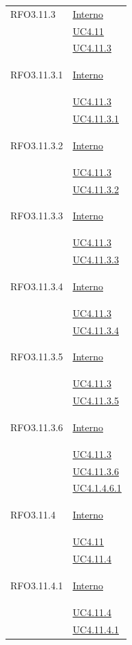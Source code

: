 \begin{longtable}{|>{\centering}m{5cm}|m{5cm}<{\centering}|}
\hypertarget{RFO3.11.3}{RFO3.11.3} & \hyperlink{Interno}{Interno}\\
& \hyperref[UC4.11]{UC4.11}\\
& \hyperref[UC4.11.3]{UC4.11.3}\\ \hline

\hypertarget{RFO3.11.3.1}{RFO3.11.3.1} & \hyperlink{Interno}{Interno}\\
& \hyperref[UC4.11.3]{UC4.11.3}\\
& \hyperref[UC4.11.3.1]{UC4.11.3.1}\\ \hline

\hypertarget{RFO3.11.3.2}{RFO3.11.3.2} & \hyperlink{Interno}{Interno}\\
& \hyperref[UC4.11.3]{UC4.11.3}\\
& \hyperref[UC4.11.3.2]{UC4.11.3.2}\\ \hline

\hypertarget{RFO3.11.3.3}{RFO3.11.3.3} & \hyperlink{Interno}{Interno}\\
& \hyperref[UC4.11.3]{UC4.11.3}\\
& \hyperref[UC4.11.3.3]{UC4.11.3.3}\\ \hline

\hypertarget{RFO3.11.3.4}{RFO3.11.3.4} & \hyperlink{Interno}{Interno}\\
& \hyperref[UC4.11.3]{UC4.11.3}\\
& \hyperref[UC4.11.3.4]{UC4.11.3.4}\\ \hline

\hypertarget{RFO3.11.3.5}{RFO3.11.3.5} & \hyperlink{Interno}{Interno}\\
& \hyperref[UC4.11.3]{UC4.11.3}\\
& \hyperref[UC4.11.3.5]{UC4.11.3.5}\\ \hline

\hypertarget{RFO3.11.3.6}{RFO3.11.3.6} & \hyperlink{Interno}{Interno}\\
& \hyperref[UC4.11.3]{UC4.11.3}\\
& \hyperref[UC4.11.3.6]{UC4.11.3.6}\\ 
& \hyperref[UC4.1.4.6.1]{UC4.1.4.6.1}\\ \hline

\hypertarget{RFO3.11.4}{RFO3.11.4} & \hyperlink{Interno}{Interno}\\
&\hyperref[UC4.11]{UC4.11}\\
&\hyperref[UC4.11.4]{UC4.11.4}\\ \hline

\hypertarget{RFO3.11.4.1}{RFO3.11.4.1} & \hyperlink{Interno}{Interno}\\
&\hyperref[UC4.11.4]{UC4.11.4}\\
&\hyperref[UC4.11.4.1]{UC4.11.4.1}\\ \hline


\end{longtable}
